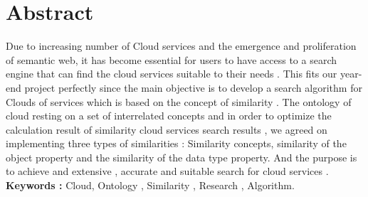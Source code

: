 \chapter*{Abstract}
Due to increasing number of Cloud services and the emergence and proliferation of semantic web, it has become essential for users to have access to  a search engine that can find the cloud services suitable to their needs .
This  fits our year-end project perfectly since the main objective is to develop a search algorithm for Clouds of services which is based on the concept of similarity .
The ontology of cloud resting on a set of interrelated concepts and in order to optimize the calculation result of similarity  cloud services  search results , we agreed on implementing three types of similarities : Similarity concepts, similarity of the object property and the similarity of the data type property.
And the purpose is to achieve and extensive , accurate and suitable search  for cloud services .
\textbf{Keywords :} Cloud, Ontology , Similarity , Research , Algorithm.\\ \ \\